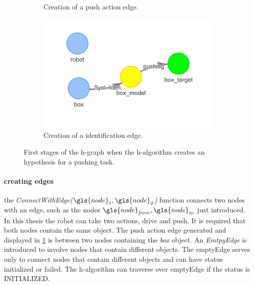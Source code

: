 \begin{figure}[h]
\begin{subfigure}{.32\textwidth}
    \caption{Creation of a push action edge.}\label{subfig:robot_push_2}
    \end{subfigure}
    \begin{subfigure}{.35\textwidth}
    \includegraphics[width=1.2\textwidth]{figures/proposed_method/connecting_nodes/robot_push/robot_push_2}
    \caption{Creation of a identification edge.}\label{subfig:robot_push_3}
    \end{subfigure}
    \caption{First stages of the \ac{h-graph} when the \ac{h-algorithm} creates an hypothesis for a pushing task.}%
    \label{fig:robot_push_1}
\end{figure}

\paragraph{creating edges}
the \textit{ConnectWithEdge($\gls{node}_1, \gls{node}_2$)} function connects two nodes with an edge, such as the nodes $\gls{node}_\mathit{from}, \gls{node}_\mathit{to}$ just introduced. In this thesis the robot can take two actions, drive and push. It is required that both nodes contain the same object. The push action edge generated and displayed in \cref{subfig:robot_push_2} is between two nodes containing the \textit{box} object. An \textit{EmtpyEdge} is introduced to involve nodes that contain different objects. The emptyEdge serves only to connect nodes that contain different objects and can have status initialized or failed. The \ac{h-algorithm} can traverse over emptyEdge if the status is INITIALIZED.\bs

